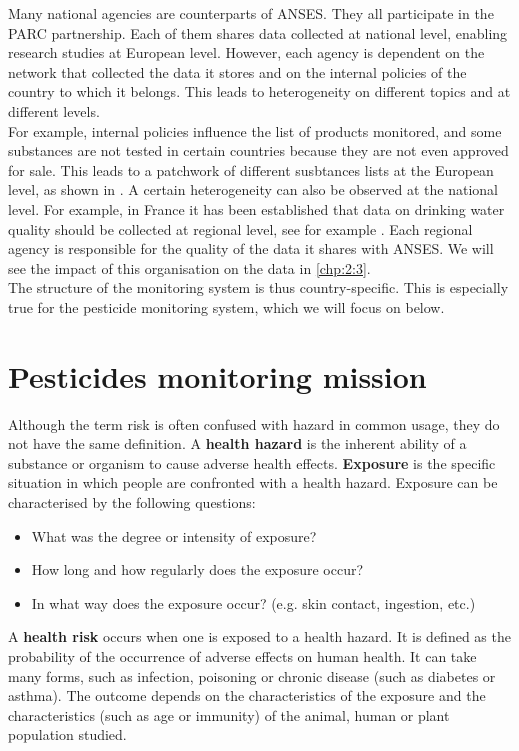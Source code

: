 Many national agencies are counterparts of ANSES. They all participate in the PARC partnership. Each of them shares data collected at national level, enabling research studies at European level. However, each agency is dependent on the network that collected the data it stores and on the internal policies of the country to which it belongs. This leads to heterogeneity on different topics and at different levels. \\
For example, internal policies influence the list of products monitored, and some substances are not tested in certain countries because they are not even approved for sale. This leads to a patchwork of different susbtances lists at the European level, as shown in \cite{Baran2022}. A certain heterogeneity can also be observed at the national level. For example, in France it has been established that data on drinking water quality should be collected at regional level, see for example \cite{Baran2022}. Each regional agency is responsible for the quality of the data it shares with ANSES. We will see the impact of this organisation on the data in  \ref{chp:2:3}. \\
The structure of the monitoring system is thus country-specific. This is especially true for the pesticide monitoring system, which we will focus on below.

\section{Pesticides monitoring mission}\label{chp:2:2}

Although the term risk is often confused with hazard in common usage, they do not have the same definition. A \textbf{health hazard} is the inherent ability of a substance or organism to cause adverse health effects. \textbf{Exposure} is the specific situation in which people are confronted with a health hazard. Exposure can be characterised by the following questions:
\begin{itemize}
\item What was the degree or intensity of exposure?
\item How long and how regularly does the exposure occur? 
\item In what way does the exposure occur? (e.g. skin contact, ingestion, etc.)
\end{itemize}
A \textbf{health risk} occurs when one is exposed to a health hazard. It is defined as the probability of the occurrence of adverse effects on human health. It can take many forms, such as infection, poisoning or chronic disease (such as diabetes or asthma). The outcome depends on the characteristics of the exposure and the characteristics (such as age or immunity) of the animal, human or plant population studied.

